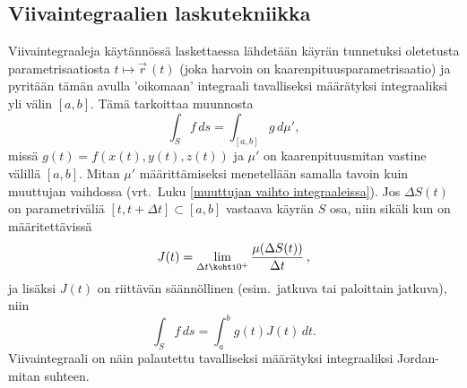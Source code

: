 \pagebreak
\subsection*{Viivaintegraalien laskutekniikka}

Viivaintegraaleja käytännössä laskettaessa lähdetään käyrän tunnetuksi oletetusta 
parametrisaatiosta $t\mapsto\vec r\,(t)$ (joka harvoin on kaarenpituusparametrisaatio) ja 
pyritään tämän avulla 'oikomaan' integraali tavalliseksi määrätyksi integraaliksi yli 
välin $[a,b]$. Tämä tarkoittaa muunnosta
\[
\int_S f\,ds=\int_{[a,b]} g\,d\mu',
\]
missä $g(t)=f(x(t),y(t),z(t))$ ja $\mu'$ on kaarenpituusmitan vastine välillä $[a,b]$. Mitan
$\mu'$ määrittämiseksi menetellään samalla tavoin kuin muuttujan vaihdossa 
(vrt.\ Luku \ref{muuttujan vaihto integraaleissa}). Jos $\Delta S(t)$ on parametriväliä
$[t,t+\Delta t]\subset [a,b]$ vastaava käyrän $S$ osa, niin sikäli kun on määritettävissä
 
\[
J(t)=\lim_{\Delta t\kohti 0^+} \frac{\mu(\Delta S(t))}{\Delta t}\,,
\]
ja lisäksi $J(t)$ on riittävän säännöllinen (esim.\ jatkuva tai paloittain jatkuva), niin
\[
\int_S f\,ds=\int_a^b g(t)J(t)\,dt.
\]
Viivaintegraali on näin palautettu tavalliseksi määrätyksi integraaliksi Jordan-mitan suhteen.

